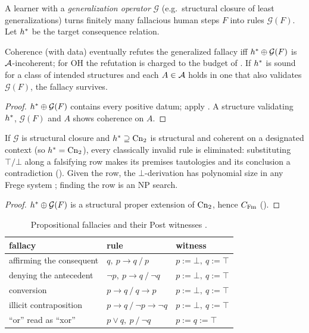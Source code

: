 A learner with a \emph{generalization operator} $\mathcal G$ (e.g.\ structural closure of least generalizations) turns finitely many fallacious human steps $F$ into rules $\mathcal G(F)$. Let $h^{*}$ be the target consequence relation.

\begin{theorem}\label{thm:coherence:elimination}
Coherence (with data) eventually refutes the generalized fallacy iff $h^{*}\oplus\mathcal G(F)$ is $\mathcal{A}$-incoherent; for OH the refutation is charged to the budget of . If $h^{*}$ is sound for a class of intended structures and each $A\in\mathcal{A}$ holds in one that also validates $\mathcal G(F)$, the fallacy survives.
\end{theorem}

\begin{proof}
$h^{*}\oplus\mathcal G(F)$ contains every positive datum; apply . A structure validating $h^{*}$, $\mathcal G(F)$ and $A$ shows coherence on $A$.
\end{proof}

\begin{corollary}\label{cor:coherence:fallacies}
If $\mathcal G$ is structural closure and $h^{*}\supseteq\mathrm{Cn}_2$ is structural and coherent on a designated context (so $h^{*}=\mathrm{Cn}_2$), every classically invalid rule is eliminated: substituting $\top/\bot$ along a falsifying row makes its premises tautologies and its conclusion a contradiction (). Given the row, the $\bot$-derivation has polynomial size in any Frege system ; finding the row is an NP search.
\end{corollary}

\begin{proof}
$h^{*}\oplus\mathcal G(F)$ is a structural proper extension of $\mathrm{Cn}_2$, hence $C_{\mathrm{Fm}}$ ().
\end{proof}

\begin{table}[t]
\centering\small
\begin{tabular}{@{}lll@{}}
\toprule
fallacy & rule & witness\\
\midrule
affirming the consequent & $q,\ p\to q\ /\ p$ & $p:=\bot,\ q:=\top$\\
denying the antecedent & $\neg p,\ p\to q\ /\ \neg q$ & $p:=\bot,\ q:=\top$\\
conversion & $p\to q\ /\ q\to p$ & $p:=\bot,\ q:=\top$\\
illicit contraposition & $p\to q\ /\ \neg p\to\neg q$ & $p:=\bot,\ q:=\top$\\
``or'' read as ``xor'' & $p\vee q,\ p\ /\ \neg q$ & $p:=q:=\top$\\
\bottomrule
\end{tabular}
\caption{Propositional fallacies and their Post witnesses .}
\label{tab:coherence:fallacies}
\end{table}

